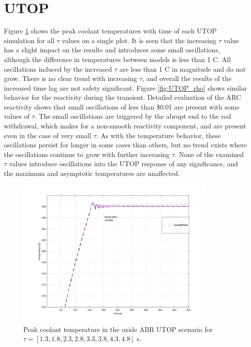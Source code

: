 \documentclass[11pt, oneside]{article}   	%
\begin{document}
\section{UTOP}
Figure \ref{fig:UTOP_peak} shows the peak coolant temperatures with time of each UTOP simulation for all $\tau$ values on a single plot.
It is seen that the increasing $\tau$ value has a slight impact on the results and introduces some small oscillations, although the difference in temperatures between models is less than 1 C.
All oscillations induced by the increased $\tau$ are less than 1 C in magnitude and do not grow.
There is no clear trend with increasing $\tau$, and overall the results of the increased time lag are not safety significant. 
Figure \ref{fig:UTOP_rho} shows similar behavior for the reactivity during the transient.
Detailed evaluation of the ARC reactivity shows that small oscillations of less than \$0.01 are present with some values of $\tau$.
The small oscillations are triggered by the abrupt end to the rod withdrawal, which makes for a non-smooth reactivity component, and are present even in the case of very small $\tau$.
As with the temperature behavior, these oscillations persist for longer in some cases than others, but no trend exists where the oscillations continue to grow with further increasing $\tau$.
None of the examined $\tau$ values introduce oscillations into the UTOP response of any significance, and the maximum and asymptotic temperatures are unaffected.

\begin{figure}[h!]
\includegraphics[width=10cm]{UTOP_peak}
\centering
\caption{Peak coolant temperature in the oxide ABR UTOP scenario for $\tau=[1.3, 1.8, 2.3, 2.8, 3.3, 3.8, 4.3, 4.8]$ s.}
\label{fig:UTOP_peak}
\end{figure}
\end{document}
